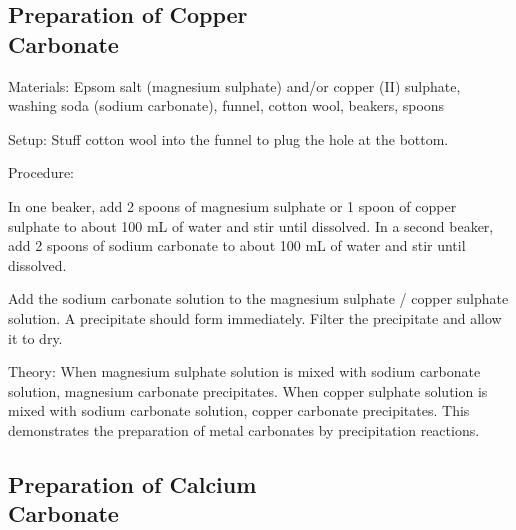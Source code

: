 \begin{multicols}{2}



\subsection[Preparation of Copper Carbonate]{Preparation of Copper \hfill \\ Carbonate} 


\begin{description*}
\item[Materials:]{Epsom salt (magnesium sulphate) and/or copper (II) sulphate, washing
soda (sodium carbonate), funnel, cotton wool, beakers, spoons}
\item[Setup:]{Stuff cotton wool into the funnel to plug the hole at the bottom.}
\item[Procedure:]{In one beaker, add 2 spoons of magnesium sulphate or 1 spoon of
copper sulphate to about 100 mL of water and stir until dissolved.
In a second beaker, add 2 spoons of sodium carbonate to about 100
mL of water and stir until dissolved. 

Add the sodium carbonate solution to the magnesium sulphate / copper sulphate solution. A precipitate should form immediately. Filter the precipitate and allow it to dry.}
\item[Theory:]{When magnesium sulphate solution is mixed with sodium carbonate solution, magnesium carbonate precipitates. When copper sulphate solution is
mixed with sodium carbonate solution, copper carbonate precipitates. This
demonstrates the preparation of metal carbonates by precipitation reactions.}
\end{description*}

\subsection[Preparation of Calcium Carbonate]{Preparation of Calcium \hfill \\ Carbonate} 


\end{multicols}
